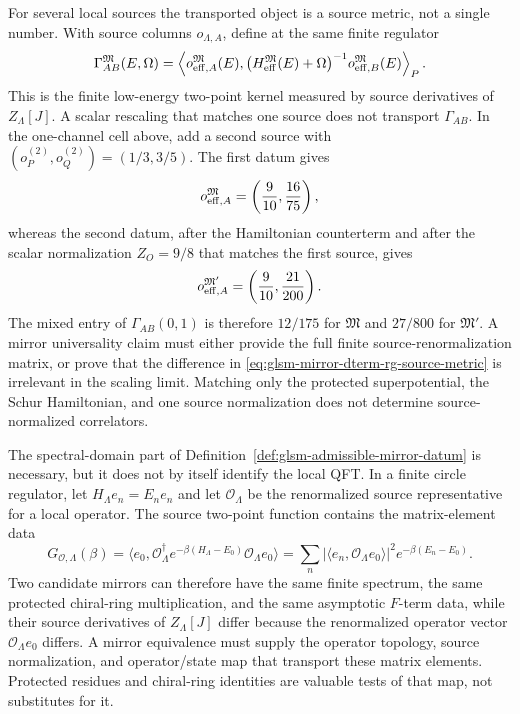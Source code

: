 \begin{remark}
For several local sources the transported object is a source metric, not a
single number.  With source columns \(o_{\Lambda,A}\), define at the same
finite regulator
\begin{equation}
  \Gamma_{AB}^{\mathfrak M}(E,\Omega)
  =
  \left\langle
  o_{{\rm eff},A}^{\mathfrak M}(E),
  \bigl(H_{\rm eff}^{\mathfrak M}(E)+\Omega\bigr)^{-1}
  o_{{\rm eff},B}^{\mathfrak M}(E)
  \right\rangle_P .
  \label{eq:glsm-mirror-dterm-rg-source-metric}
\end{equation}
This is the finite low-energy two-point kernel measured by source derivatives
of \(Z_\Lambda[J]\).  A scalar rescaling that matches one source does not
transport \(\Gamma_{AB}\).  In the one-channel cell above, add a second source
with \((o_P^{(2)},o_Q^{(2)})=(1/3,3/5)\).  The first datum gives
\[
  o_{{\rm eff},A}^{\mathfrak M}=\left(\frac9{10},\frac{16}{75}\right),
\]
whereas the second datum, after the Hamiltonian counterterm and after the
scalar normalization \(Z_O=9/8\) that matches the first source, gives
\[
  o_{{\rm eff},A}^{\mathfrak M'}=
  \left(\frac9{10},\frac{21}{200}\right).
\]
The mixed entry of \(\Gamma_{AB}(0,1)\) is therefore \(12/175\) for
\(\mathfrak M\) and \(27/800\) for \(\mathfrak M'\).  A mirror universality
claim must either provide the full finite source-renormalization matrix, or
prove that the difference in
\eqref{eq:glsm-mirror-dterm-rg-source-metric} is irrelevant in the scaling
limit.  Matching only the protected superpotential, the Schur Hamiltonian, and
one source normalization does not determine source-normalized correlators.
\end{remark}

\begin{remark}
\label{rem:glsm-mirror-operator-source-data}
The spectral-domain part of
Definition~\ref{def:glsm-admissible-mirror-datum} is necessary, but it does
not by itself identify the local QFT.  In a finite circle regulator, let
\(H_\Lambda e_n=E_n e_n\) and let \({\mathcal O}_{\Lambda}\) be the
renormalized source representative for a local operator.  The source
two-point function contains the matrix-element data
\[
  G_{{\mathcal O},\Lambda}(\beta)
  =
  \langle e_0,
    {\mathcal O}_{\Lambda}^{\dagger}
    e^{-\beta(H_\Lambda-E_0)}
    {\mathcal O}_{\Lambda}
  e_0\rangle
  =
  \sum_n
  |\langle e_n,{\mathcal O}_{\Lambda}e_0\rangle|^2
  e^{-\beta(E_n-E_0)} .
\]
Two candidate mirrors can therefore have the same finite spectrum, the same
protected chiral-ring multiplication, and the same asymptotic \(F\)-term data,
while their source derivatives of \(Z_\Lambda[J]\) differ because the
renormalized operator vector \({\mathcal O}_{\Lambda}e_0\) differs.  A mirror
equivalence must supply the operator topology, source normalization, and
operator/state map that transport these matrix elements.  Protected residues
and chiral-ring identities are valuable tests of that map, not substitutes for
it.
\end{remark}

